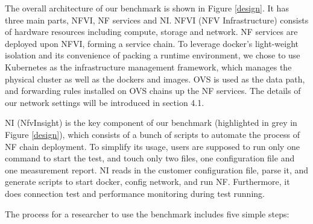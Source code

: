 
The overall architecture of our benchmark is shown in Figure \ref{design}.
It has three main parts, NFVI, NF services and NI.
NFVI (NFV Infrastructure) consists of hardware resources
including compute, storage and network. 
NF services are deployed upon NFVI, forming a service chain. 
To leverage docker's light-weight isolation 
and its convenience of packing a runtime environment, 
we chose to use Kubernetes as the infrastructure management framework, 
which manages the physical cluster as well as the dockers and images. 
OVS is used as the data path, 
and forwarding rules installed on OVS chains up the NF services.
The details of our network settings will be introduced in section 4.1.

NI (NfvInsight) is the key component of our benchmark 
(highlighted in grey in Figure  \ref{design}), 
which consists of a bunch of scripts 
to automate the process of NF chain deployment.
To simplify its usage, 
users are supposed to run only one command to start the test,
and touch only two files, 
one configuration file and one measurement report.
NI reads in the customer configuration file, 
parse it, and generate scripts to start docker, config network, and run NF.
Furthermore, it does connection test and performance monitoring during test running.

The process for a researcher to use the benchmark includes five simple steps:

